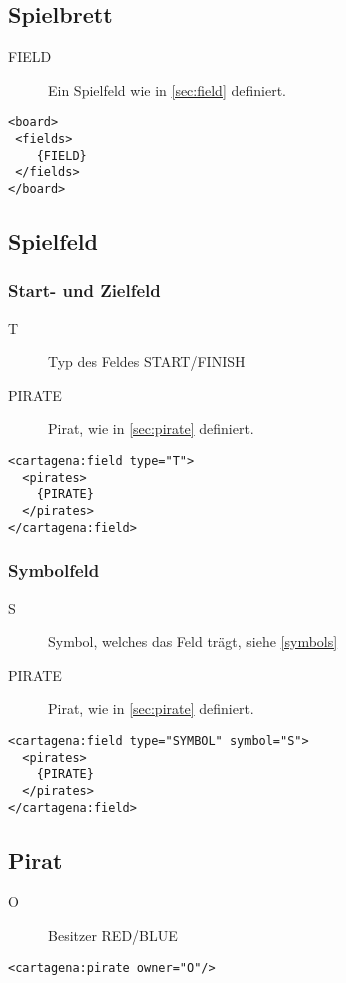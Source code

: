 \documentclass[12pt,a4paper, ngerman, oneside]{scrartcl}
\begin{document}
\subsection{\label{board}Spielbrett}
\begin{description}
\item[FIELD] Ein Spielfeld wie in \ref{sec:field} definiert.
\end{description}
\begin{verbatim}
<board>
 <fields>
 	{FIELD}
 </fields>
</board>
\end{verbatim}

\subsection{\label{sec:field}Spielfeld}
\subsubsection{\label{sec:startEndField} Start- und Zielfeld}
\begin{description}
\item[T] Typ des Feldes START/FINISH
\item[PIRATE] Pirat, wie in \ref{sec:pirate} definiert.
\end{description}
\begin{verbatim}
<cartagena:field type="T">
  <pirates>
  	{PIRATE}
  </pirates>
</cartagena:field>
\end{verbatim}

\subsubsection{\label{sec:symbolField} Symbolfeld}
\begin{description}
\item[S] Symbol, welches das Feld trägt, siehe \ref{symbols}
\item[PIRATE] Pirat, wie in \ref{sec:pirate} definiert.
\end{description}
\begin{verbatim}
<cartagena:field type="SYMBOL" symbol="S">
  <pirates>
  	{PIRATE}
  </pirates>
</cartagena:field>
\end{verbatim}

\subsection{\label{sec:pirate}Pirat}
\begin{description}
\item[O] Besitzer RED/BLUE
\end{description}
\begin{verbatim}
<cartagena:pirate owner="O"/>
\end{verbatim}
\end{document}
